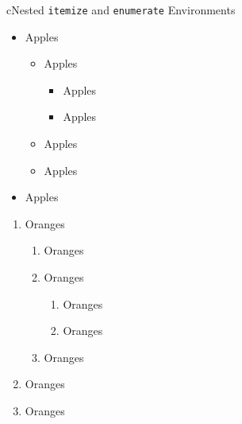 \begin{myslide}{c}{Nested \lstinline{itemize} and \lstinline{enumerate} Environments}



\begin{itemize}

\item Apples

\begin{itemize}

\item Apples

\begin{itemize}

\item Apples

\item Apples

\end{itemize}

\item Apples

\item Apples

\end{itemize}

\item Apples

\end{itemize}

\begin{enumerate}

\item Oranges

\begin{enumerate}

\item Oranges

\item Oranges

\begin{enumerate}

\item Oranges

\item Oranges

\end{enumerate}

\item Oranges

\end{enumerate}

\item Oranges

\item Oranges

\end{enumerate}

\end{myslide}
